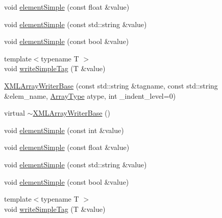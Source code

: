 \begin{DoxyCompactItemize}
\item 
void \mbox{\hyperlink{classXMLStructWriterAPI_1_1XMLArrayWriterBase_a7bb84df43c22d343c2006f1561ea3133}{element\+Simple}} (const float \&value)
\item 
void \mbox{\hyperlink{classXMLStructWriterAPI_1_1XMLArrayWriterBase_a1ec9aad9885d357f65462b5d4a7cf593}{element\+Simple}} (const std\+::string \&value)
\item 
void \mbox{\hyperlink{classXMLStructWriterAPI_1_1XMLArrayWriterBase_a69c66b868b51c45555aca1c5f857710e}{element\+Simple}} (const bool \&value)
\item 
{\footnotesize template$<$typename T $>$ }\\void \mbox{\hyperlink{classXMLStructWriterAPI_1_1XMLArrayWriterBase_a7c0092991561b5000ae55724cdc3d062}{write\+Simple\+Tag}} (T \&value)
\item 
\mbox{\hyperlink{classXMLStructWriterAPI_1_1XMLArrayWriterBase_a0df8629240d895664bd6e2dce1b53691}{X\+M\+L\+Array\+Writer\+Base}} (const std\+::string \&tagname, const std\+::string \&elem\+\_\+name, \mbox{\hyperlink{namespaceXMLStructWriterAPI_a2017208be87c77a32bdc19ea2f14d032}{Array\+Type}} atype, int \+\_\+indent\+\_\+level=0)
\item 
virtual \mbox{\hyperlink{classXMLStructWriterAPI_1_1XMLArrayWriterBase_accb141c8e382b112256e15dec7499b7f}{$\sim$\+X\+M\+L\+Array\+Writer\+Base}} ()
\item 
void \mbox{\hyperlink{classXMLStructWriterAPI_1_1XMLArrayWriterBase_a4523996304d9e9468147d12602257364}{element\+Simple}} (const int \&value)
\item 
void \mbox{\hyperlink{classXMLStructWriterAPI_1_1XMLArrayWriterBase_a7bb84df43c22d343c2006f1561ea3133}{element\+Simple}} (const float \&value)
\item 
void \mbox{\hyperlink{classXMLStructWriterAPI_1_1XMLArrayWriterBase_a1ec9aad9885d357f65462b5d4a7cf593}{element\+Simple}} (const std\+::string \&value)
\item 
void \mbox{\hyperlink{classXMLStructWriterAPI_1_1XMLArrayWriterBase_a69c66b868b51c45555aca1c5f857710e}{element\+Simple}} (const bool \&value)
\item 
{\footnotesize template$<$typename T $>$ }\\void \mbox{\hyperlink{classXMLStructWriterAPI_1_1XMLArrayWriterBase_a7c0092991561b5000ae55724cdc3d062}{write\+Simple\+Tag}} (T \&value)
\end{DoxyCompactItemize}
